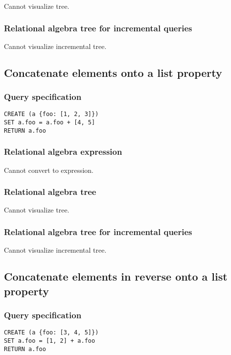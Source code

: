 Cannot visualize tree.

\subsubsection*{Relational algebra tree for incremental queries}

Cannot visualize incremental tree.

\subsection{Concatenate elements onto a list property}

\subsubsection*{Query specification}

\begin{lstlisting}
CREATE (a {foo: [1, 2, 3]})
SET a.foo = a.foo + [4, 5]
RETURN a.foo
\end{lstlisting}

\subsubsection*{Relational algebra expression}

Cannot convert to expression.

\subsubsection*{Relational algebra tree}

Cannot visualize tree.

\subsubsection*{Relational algebra tree for incremental queries}

Cannot visualize incremental tree.

\subsection{Concatenate elements in reverse onto a list property}

\subsubsection*{Query specification}

\begin{lstlisting}
CREATE (a {foo: [3, 4, 5]})
SET a.foo = [1, 2] + a.foo
RETURN a.foo
\end{lstlisting}

